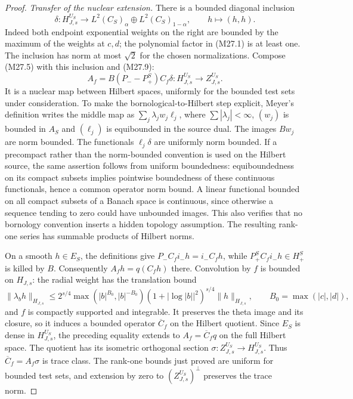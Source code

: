\begin{proof}
\emph{Transfer of the nuclear extension.}
There is a bounded diagonal inclusion
\[
 \delta:H_{J,s}^{U_S}\longrightarrow
       L^2(C_S)_\alpha\oplus L^2(C_S)_{1-\alpha},
       \qquad h\longmapsto(h,h).
                                                               \tag{M27.10}
\]
Indeed both endpoint exponential weights on the
right are bounded by the maximum of the weights
at $c,d$; the polynomial factor in (M27.1) is
at least one. The inclusion has norm at most
$\sqrt2$ for the chosen normalizations.
Compose (M27.5) with this inclusion and (M27.9):
\[
              A_f=B(P_--P_+^S)C_f\delta:
                     H_{J,s}^{U_S}\to Z_{J,s}^{U_S}.
                                                               \tag{M27.11}
\]
It is a nuclear map between Hilbert spaces,
uniformly for the bounded test sets under consideration.
To make the bornological-to-Hilbert step explicit,
Meyer's definition writes the middle map as
$\sum_j\lambda_j w_j\ell_j$, where
$\sum|\lambda_j|<\infty$, $(w_j)$ is bounded in
$A_S$ and $(\ell_j)$ is equibounded in the source
dual. The images $Bw_j$ are norm bounded.
The functionals $\ell_j\delta$ are uniformly
norm bounded. If a precompact rather than the
norm-bounded convention is used on the Hilbert
source, the same assertion follows from uniform
boundedness: equiboundedness on its compact
subsets implies pointwise boundedness of these
continuous functionals, hence a common operator
norm bound. A linear functional bounded on all
compact subsets of a Banach space is continuous,
since otherwise a sequence tending to zero
could have unbounded images. This also verifies
that no bornology convention inserts a hidden
topology assumption. The resulting rank-one
series has summable products of Hilbert norms.

On a smooth $h\in E_S$, the definitions give
$P_-C_fi_-h=i_-C_fh$, while
$P_+^SC_fi_-h\in H_+^S$ is killed by $B$.
Consequently $A_fh=q(C_fh)$ there.
Convolution by $f$ is bounded on $H_{J,s}$:
the radial weight has the translation bound
\[
 \|\lambda_b h\|_{H_{J,s}}
  \le2^{s/4}\max(|b|^{B_0},|b|^{-B_0})
       (1+|\log|b||^2)^{s/4}\|h\|_{H_{J,s}},
 \qquad B_0=\max(|c|,|d|),
\]
and $f$ is compactly supported and integrable.
It preserves the theta image and its closure,
so it induces a bounded operator $\overline C_f$
on the Hilbert quotient. Since $E_S$ is dense
in $H_{J,s}^{U_S}$, the preceding equality extends
to $A_f=\overline C_fq$ on the full Hilbert space.
The quotient has its isometric orthogonal
section $\sigma:Z_{J,s}^{U_S}\to H_{J,s}^{U_S}$.
Thus $\overline C_f=A_f\sigma$ is trace class.
The rank-one bounds just proved are uniform for
bounded test sets, and extension by zero to
$(Z_{J,s}^{U_S})^\perp$ preserves the trace norm.


\end{proof}
